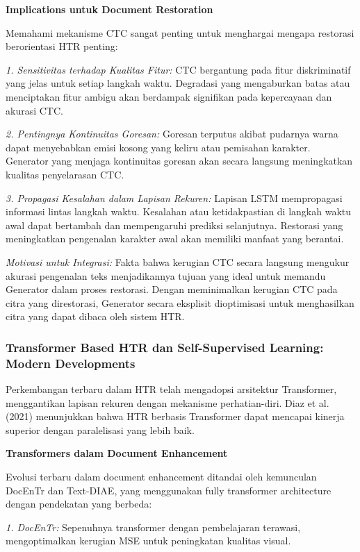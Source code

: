\documentclass[12pt,a4paper]{article}
\begin{document}
\textbf{Implications untuk Document Restoration}

Memahami mekanisme CTC sangat penting untuk menghargai mengapa restorasi berorientasi HTR penting:

\textit{1. Sensitivitas terhadap Kualitas Fitur:} CTC bergantung pada fitur diskriminatif yang jelas untuk setiap langkah waktu. Degradasi yang mengaburkan batas atau menciptakan fitur ambigu akan berdampak signifikan pada kepercayaan dan akurasi CTC.

\textit{2. Pentingnya Kontinuitas Goresan:} Goresan terputus akibat pudarnya warna dapat menyebabkan emisi kosong yang keliru atau pemisahan karakter. Generator yang menjaga kontinuitas goresan akan secara langsung meningkatkan kualitas penyelarasan CTC.

\textit{3. Propagasi Kesalahan dalam Lapisan Rekuren:} Lapisan LSTM mempropagasi informasi lintas langkah waktu. Kesalahan atau ketidakpastian di langkah waktu awal dapat bertambah dan mempengaruhi prediksi selanjutnya. Restorasi yang meningkatkan pengenalan karakter awal akan memiliki manfaat yang berantai.

\textit{Motivasi untuk Integrasi:} Fakta bahwa kerugian CTC secara langsung mengukur akurasi pengenalan teks menjadikannya tujuan yang ideal untuk memandu Generator dalam proses restorasi. Dengan meminimalkan kerugian CTC pada citra yang direstorasi, Generator secara eksplisit dioptimisasi untuk menghasilkan citra yang dapat dibaca oleh sistem HTR.

\subsubsection{Transformer Based HTR dan Self-Supervised Learning: Modern Developments}
\label{subsubsec:transformer-htr}

Perkembangan terbaru dalam HTR telah mengadopsi arsitektur Transformer, menggantikan lapisan rekuren dengan mekanisme perhatian-diri. Diaz et al. (2021) menunjukkan bahwa HTR berbasis Transformer dapat mencapai kinerja superior dengan paralelisasi yang lebih baik.

\textbf{Transformers dalam Document Enhancement}

Evolusi terbaru dalam document enhancement ditandai oleh kemunculan DocEnTr dan Text-DIAE, yang menggunakan fully transformer architecture dengan pendekatan yang berbeda:

\textit{1. DocEnTr:} Sepenuhnya transformer dengan pembelajaran terawasi, mengoptimalkan kerugian MSE untuk peningkatan kualitas visual.
\end{document}
